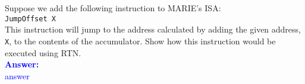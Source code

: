 \item{}
Suppose we add the following instruction to MARIE’s ISA:\\[6pt]
{\tt JumpOffset X}\\[6pt]
This instruction will jump to the address calculated by adding the given
address, {\tt X}, to the contents of the accumulator. Show how this
instruction would be executed using RTN.\\[12pt]
\ifanswers
\textcolor{blue}{
\textbf{Answer:}\\
answer
}
\newpage
\fi


